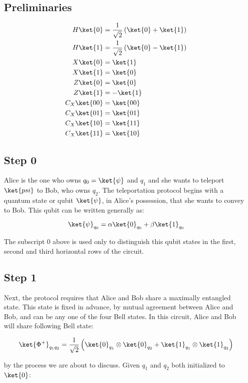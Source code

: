 \documentclass[10pt,a4paper]{article}
\newcommand{\<}{\langle}
\renewcommand{\>}{\rangle}
\newcommand{\prths}[1]{\left( #1 \right)}
\begin{document}
\subsection{Preliminaries}
\begin{align*}
  H \ket{0} & = \frac{1}{\sqrt{2}} \prths{\ket{0} + \ket{1}} \\
  H \ket{1} & = \frac{1}{\sqrt{2}} \prths{\ket{0} - \ket{1}} \\
  X \ket{0} & = \ket{1} \\
  X \ket{1} & = \ket{0} \\
  Z \ket{0} & = \ket{0} \\
  Z \ket{1} & = -\ket{1} \\
  C_X \ket{00} & = \ket{00} \\
  C_X \ket{01} & = \ket{01} \\
  C_X \ket{10} & = \ket{11} \\
  C_X \ket{11} & = \ket{10} \\
\end{align*}
\subsection{Step 0}
Alice is the one who owns $q_0 = \ket{\psi}$ and $q_1$ and she wants to teleport $\ket{psi}$ to Bob,
who owns $q_2$.
The teleportation protocol begins with a quantum state or qubit $\ket{\psi}$, in Alice's
possession, that she wants to convey to Bob. This qubit can be written generally as:

$$
\ket{\psi}_{q_0} = \alpha \ket{0}_{q_0} + \beta \ket{1}_{q_0}
$$

The subscript $0$ above is used only to distinguish this qubit states in the first, second and third
horizontal rows of the circuit.

\subsection{Step 1}
Next, the protocol requires that Alice and Bob share a maximally entangled state. This state is
fixed in advance, by mutual agreement between Alice and Bob, and can be any one of the four Bell
states. In this circuit, Alice and Bob will share following Bell state:

$$
\ket{\Phi^+}_{q_1q_2} =
\frac{1}{\sqrt{2}}
\prths{
\ket{0}_{q_1} \otimes \ket{0}_{q_2} +
\ket{1}_{q_1} \otimes \ket{1}_{q_2}
}
$$

by the process we are about to discuss. Given $q_1$ and $q_2$ both initialized to $\ket{0}$:
\end{document}
